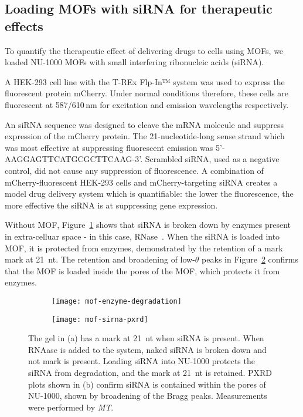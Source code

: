 \subsection{Loading MOFs with siRNA for therapeutic effects} \label{sec:MOF-siRNA}
To quantify the therapeutic effect of delivering drugs to cells using MOFs, we loaded NU-1000 MOFs with small interfering ribonucleic acids (siRNA). 

A HEK-293 cell line with the T-REx Flp-In™ system was used to express the fluorescent protein mCherry. 
Under normal conditions therefore, these cells are fluorescent at 587/610\,\si{\nano\meter} for excitation and emission wavelengths respectively. 

An siRNA sequence was designed to cleave the mRNA molecule and suppress expression of the mCherry protein.
The 21-nucleotide-long sense strand which was most effective at suppressing fluorescent emission was 5'-AAGGAGTTCATGCGCTTCAAG-3'. 
Scrambled siRNA, used as a negative control, did not cause any suppression of fluorescence.
A combination of mCherry-fluorescent HEK-293 cells and mCherry-targeting siRNA creates a model drug delivery system which is quantifiable: the lower the fluorescence, the more effective the siRNA is at suppressing gene expression. 

Without MOF, Figure~\ref{fig:mof-enzyme-degradation} shows that siRNA is broken down by enzymes present in extra-celluar space - in this case, RNase~\cite{chirgwin1979isolation}.
When the siRNA is loaded into MOF, it is protected from enzymes, demonstrated by the retention of a mark mark at \SI{21}{nt}. 
The retention and broadening of low-$\theta$ peaks in Figure~\ref{fig:mof-sirna-pxrd} confirms that the MOF is loaded inside the pores of the MOF, which protects it from enzymes. 

\begin{figure}[htbp!]
	\centering
	\begin{subfigure}[b]{0.49\textwidth}
		\texttt{[image: mof-enzyme-degradation]}
		\caption{} \label{fig:mof-enzyme-degradation}
	\end{subfigure}
	\hfill
	\begin{subfigure}[b]{0.49\textwidth}
		\texttt{[image: mof-sirna-pxrd]}
		\caption{} \label{fig:mof-sirna-pxrd}
	\end{subfigure}			
	\caption[MOFs: NU-1000 protects siRNA from degradation by enzymes in extracellular space]{The gel in (a) has a mark at \SI{21}{nt} when siRNA is present. When RNAase is added to the system, naked siRNA is broken down and not mark is present. Loading siRNA into NU-1000 protects the siRNA from degradation, and the mark at \SI{21}{nt} is retained. PXRD plots shown in (b) confirm siRNA is contained within the pores of NU-1000, shown by broadening of the Bragg peaks. Measurements were performed by \textit{MT}. }
\label{fig:mof-enzyme-pxrd}
\end{figure}

